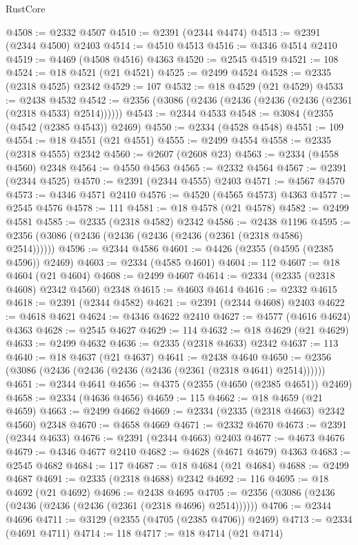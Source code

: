 \begin{lexlean}{RustCore}
\begin{coremodule}
@4508 := @2332 @4507
@4510 := @2391 (@2344 @4474)
@4513 := @2391 (@2344 @4500) @2403
@4514 := @4510 @4513
@4516 := @4346 @4514 @2410
@4519 := @4469 (@4508 @4516) @4363
@4520 := @2545 @4519
@4521 := 108
@4524 := @18 @4521 (@21 @4521)
@4525 := @2499 @4524
@4528 := @2335 (@2318 @4525) @2342
@4529 := 107
@4532 := @18 @4529 (@21 @4529)
@4533 := @2438 @4532
@4542 := @2356 (@3086 (@2436 (@2436 (@2436 (@2436 (@2361 (@2318 @4533) @2514))))))
@4543 := @2344 @4533
@4548 := @3084 (@2355 (@4542 (@2385 @4543)) @2469)
@4550 := @2334 (@4528 @4548)
@4551 := 109
@4554 := @18 @4551 (@21 @4551)
@4555 := @2499 @4554
@4558 := @2335 (@2318 @4555) @2342
@4560 := @2607 (@2608 @23)
@4563 := @2334 (@4558 @4560) @2348
@4564 := @4550 @4563
@4565 := @2332 @4564
@4567 := @2391 (@2344 @4525)
@4570 := @2391 (@2344 @4555) @2403
@4571 := @4567 @4570
@4573 := @4346 @4571 @2410
@4576 := @4520 (@4565 @4573) @4363
@4577 := @2545 @4576
@4578 := 111
@4581 := @18 @4578 (@21 @4578)
@4582 := @2499 @4581
@4585 := @2335 (@2318 @4582) @2342
@4586 := @2438 @1196
@4595 := @2356 (@3086 (@2436 (@2436 (@2436 (@2436 (@2361 (@2318 @4586) @2514))))))
@4596 := @2344 @4586
@4601 := @4426 (@2355 (@4595 (@2385 @4596)) @2469)
@4603 := @2334 (@4585 @4601)
@4604 := 112
@4607 := @18 @4604 (@21 @4604)
@4608 := @2499 @4607
@4614 := @2334 (@2335 (@2318 @4608) @2342 @4560) @2348
@4615 := @4603 @4614
@4616 := @2332 @4615
@4618 := @2391 (@2344 @4582)
@4621 := @2391 (@2344 @4608) @2403
@4622 := @4618 @4621
@4624 := @4346 @4622 @2410
@4627 := @4577 (@4616 @4624) @4363
@4628 := @2545 @4627
@4629 := 114
@4632 := @18 @4629 (@21 @4629)
@4633 := @2499 @4632
@4636 := @2335 (@2318 @4633) @2342
@4637 := 113
@4640 := @18 @4637 (@21 @4637)
@4641 := @2438 @4640
@4650 := @2356 (@3086 (@2436 (@2436 (@2436 (@2436 (@2361 (@2318 @4641) @2514))))))
@4651 := @2344 @4641
@4656 := @4375 (@2355 (@4650 (@2385 @4651)) @2469)
@4658 := @2334 (@4636 @4656)
@4659 := 115
@4662 := @18 @4659 (@21 @4659)
@4663 := @2499 @4662
@4669 := @2334 (@2335 (@2318 @4663) @2342 @4560) @2348
@4670 := @4658 @4669
@4671 := @2332 @4670
@4673 := @2391 (@2344 @4633)
@4676 := @2391 (@2344 @4663) @2403
@4677 := @4673 @4676
@4679 := @4346 @4677 @2410
@4682 := @4628 (@4671 @4679) @4363
@4683 := @2545 @4682
@4684 := 117
@4687 := @18 @4684 (@21 @4684)
@4688 := @2499 @4687
@4691 := @2335 (@2318 @4688) @2342
@4692 := 116
@4695 := @18 @4692 (@21 @4692)
@4696 := @2438 @4695
@4705 := @2356 (@3086 (@2436 (@2436 (@2436 (@2436 (@2361 (@2318 @4696) @2514))))))
@4706 := @2344 @4696
@4711 := @3129 (@2355 (@4705 (@2385 @4706)) @2469)
@4713 := @2334 (@4691 @4711)
@4714 := 118
@4717 := @18 @4714 (@21 @4714)

\end{coremodule}
\end{lexlean}
